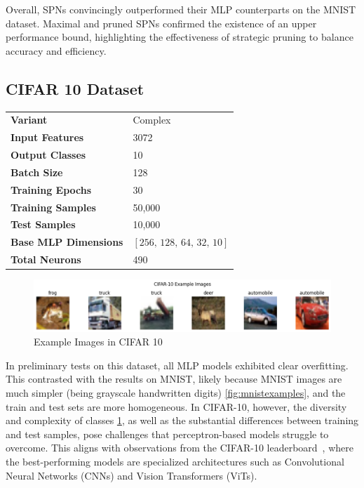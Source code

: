 Overall, SPNs convincingly outperformed their MLP counterparts on the MNIST dataset. Maximal and pruned SPNs confirmed the existence of an upper performance bound, highlighting the effectiveness of strategic pruning to balance accuracy and efficiency.

\subsection{CIFAR 10 Dataset}

\begin{tabular}{@{}ll@{}}
\textbf{Variant} & Complex \\
\textbf{Input Features} & 3072 \\
\textbf{Output Classes} & 10 \\
\textbf{Batch Size} & 128 \\
\textbf{Training Epochs} & 30 \\
\textbf{Training Samples} & 50,000 \\
\textbf{Test Samples} & 10,000 \\
\textbf{Base MLP Dimensions} & $[256,\, 128,\, 64,\, 32,\, 10]$ \\
\textbf{Total Neurons} & 490 \\
\end{tabular}

\begin{figure}[H]
    \centering
    \includegraphics[width=1.0\textwidth]{Figures/Results/CIFAR_10/examples.png} 
    \captionsetup{justification=centering}  %
    \caption{Example Images in CIFAR 10}
    \label{fig:cifarexamples}
\end{figure}

In preliminary tests on this dataset, all MLP models exhibited clear overfitting. This contrasted with the results on MNIST, likely because MNIST images are much simpler (being grayscale handwritten digits) \ref{fig:mnistexamples}, and the train and test sets are more homogeneous. In CIFAR-10, however, the diversity and complexity of classes \ref{fig:cifarexamples}, as well as the substantial differences between training and test samples, pose challenges that perceptron-based models struggle to overcome. This aligns with observations from the CIFAR-10 leaderboard~\cite{pwc_cifar10_leaderboard}, where the best-performing models are specialized architectures such as Convolutional Neural Networks (CNNs) and Vision Transformers (ViTs).

